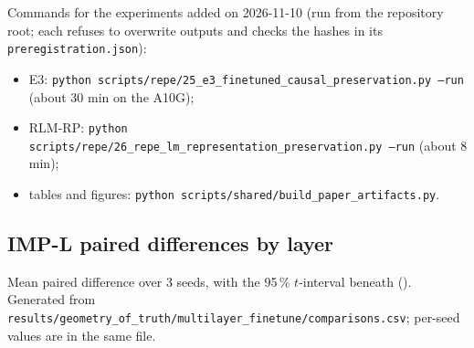 Commands for the experiments added on 2026-11-10 (run from the repository root; each refuses to overwrite outputs and
checks the hashes in its \texttt{preregistration.json}):
\begin{itemize}
  \item E3: \texttt{python scripts/\allowbreak{}repe/\allowbreak{}25\_e3\_finetuned\_causal\_preservation.py --run} (about 30 min on the A10G);
  \item RLM-RP: \texttt{python scripts/\allowbreak{}repe/\allowbreak{}26\_repe\_lm\_representation\_preservation.py --run} (about 8 min);
  \item tables and figures: \texttt{python scripts/\allowbreak{}shared/\allowbreak{}build\_paper\_artifacts.py}.
\end{itemize}


\subsection{IMP-L paired differences by layer}\label{app:impl}
Mean paired difference over 3 seeds, with the 95\,\% $t$-interval beneath (). Generated from
\texttt{results/geometry\_of\_truth/multilayer\_finetune/comparisons.csv}; per-seed values are in the same file.




\clearpage
